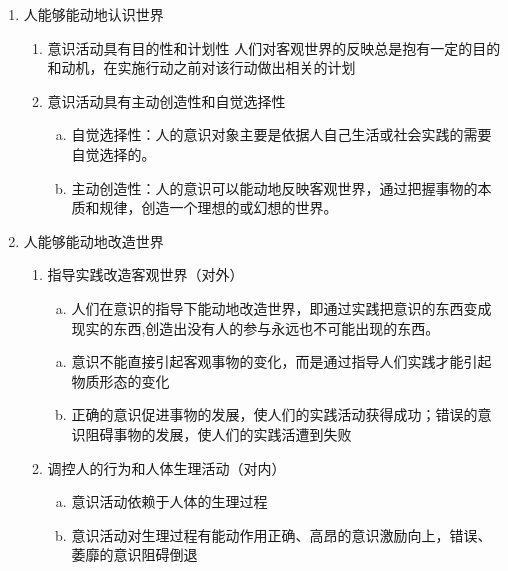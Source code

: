 \documentclass[12pt]{book}
\begin{document}
\begin{enumerate}[1.]
    \item 人能够能动地认识世界
          \begin{enumerate}[(1)]
              \item 意识活动具有目的性和计划性
                    人们对客观世界的反映总是抱有一定的目的和动机，在实施行动之前对该行动做出相关的计划
              \item 意识活动具有主动创造性和自觉选择性
                    \begin{enumerate}[a.]
                        \item 自觉选择性：人的意识对象主要是依据人自己生活或社会实践的需要自觉选择的。
                        \item 主动创造性：人的意识可以能动地反映客观世界，通过把握事物的本质和规律，创造一个理想的或幻想的世界。
                    \end{enumerate}
          \end{enumerate}
    \item 人能够能动地改造世界
          \begin{enumerate}[(1)]
              \item 指导实践改造客观世界（对外）
                    \begin{enumerate}[a.]
                        \item 人们在意识的指导下能动地改造世界，即通过实践把意识的东西变成现实的东西,创造出没有人的参与永远也不可能出现的东西。
                    \end{enumerate}
                    \begin{enumerate}[a.]
                        \item 意识不能直接引起客观事物的变化，而是通过指导人们实践才能引起物质形态的变化
                        \item 正确的意识促进事物的发展，使人们的实践活动获得成功；错误的意识阻碍事物的发展，使人们的实践活遭到失败
                    \end{enumerate}
              \item 调控人的行为和人体生理活动（对内）
                    \begin{enumerate}[a.]
                        \item 意识活动依赖于人体的生理过程
                        \item 意识活动对生理过程有能动作用正确、高昂的意识激励向上，错误、萎靡的意识阻碍倒退
                    \end{enumerate}
          \end{enumerate}
\end{enumerate}
\end{document}
